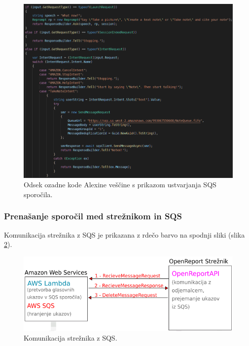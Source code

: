 \documentclass[a4paper, 12pt]{book}
\begin{document}
\begin{figure}[H]
\begin{center}
\includegraphics[width=13.5cm]{skill_code}
\end{center}
\caption{Odsek ozadne kode Alexine veščine s prikazom ustvarjanja SQS sporočila.}
\label{skill_code}
\end{figure}

\subsubsection{Prenašanje sporočil med strežnikom in SQS}

Komunikacija strežnika z SQS je prikazana z rdečo barvo na spodnji sliki (slika \ref{plan_sqs_server}).

\begin{figure}[H]
\begin{center}
\includegraphics[width=13cm]{plan_sqs_server}
\end{center}
\caption{Komunikacija strežnika z SQS.}
\label{plan_sqs_server}
\end{figure}
\end{document}
